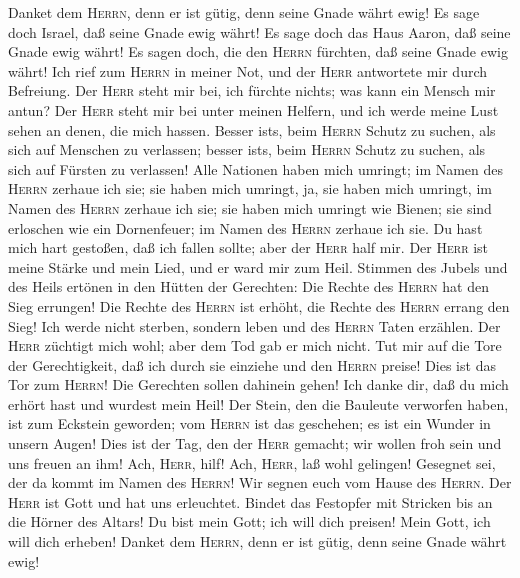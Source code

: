  Danket dem \textsc{Herrn}, denn er ist gütig, denn seine
Gnade währt ewig!  Es sage doch Israel, daß seine Gnade
ewig währt!  Es sage doch das Haus Aaron, daß seine Gnade
ewig währt!  Es sagen doch, die den \textsc{Herrn}
fürchten, daß seine Gnade ewig währt!  Ich rief zum
\textsc{Herrn} in meiner Not, und der \textsc{Herr} antwortete mir durch
Befreiung.  Der \textsc{Herr} steht mir bei, ich fürchte
nichts; was kann ein Mensch mir antun?  Der \textsc{Herr}
steht mir bei unter meinen Helfern, und ich werde meine Lust sehen an
denen, die mich hassen.  Besser ist\textquotesingle s,
beim \textsc{Herrn} Schutz zu suchen, als sich auf Menschen zu
verlassen;  besser ist\textquotesingle s, beim
\textsc{Herrn} Schutz zu suchen, als sich auf Fürsten zu verlassen!
 Alle Nationen haben mich umringt; im Namen des
\textsc{Herrn} zerhaue ich sie;  sie haben mich umringt,
ja, sie haben mich umringt, im Namen des \textsc{Herrn} zerhaue ich sie;
 sie haben mich umringt wie Bienen; sie sind erloschen
wie ein Dornenfeuer; im Namen des \textsc{Herrn} zerhaue ich sie.
 Du hast mich hart gestoßen, daß ich fallen sollte; aber
der \textsc{Herr} half mir.  Der \textsc{Herr} ist meine
Stärke und mein Lied, und er ward mir zum Heil.  Stimmen
des Jubels und des Heils ertönen in den Hütten der Gerechten: Die Rechte
des \textsc{Herrn} hat den Sieg errungen!  Die Rechte des
\textsc{Herrn} ist erhöht, die Rechte des \textsc{Herrn} errang den
Sieg!  Ich werde nicht sterben, sondern leben und des
\textsc{Herrn} Taten erzählen.  Der \textsc{Herr}
züchtigt mich wohl; aber dem Tod gab er mich nicht.  Tut
mir auf die Tore der Gerechtigkeit, daß ich durch sie einziehe und den
\textsc{Herrn} preise!  Dies ist das Tor zum
\textsc{Herrn}! Die Gerechten sollen dahinein gehen!  Ich
danke dir, daß du mich erhört hast und wurdest mein Heil!
 Der Stein, den die Bauleute verworfen haben, ist zum
Eckstein geworden;  vom \textsc{Herrn} ist das geschehen;
es ist ein Wunder in unsern Augen!  Dies ist der Tag, den
der \textsc{Herr} gemacht; wir wollen froh sein und uns freuen an ihm!
 Ach, \textsc{Herr}, hilf! Ach, \textsc{Herr}, laß wohl
gelingen!  Gesegnet sei, der da kommt im Namen des
\textsc{Herrn}! Wir segnen euch vom Hause des \textsc{Herrn}.
 Der \textsc{Herr} ist Gott und hat uns erleuchtet.
Bindet das Festopfer mit Stricken bis an die Hörner des Altars!
 Du bist mein Gott; ich will dich preisen! Mein Gott, ich
will dich erheben!  Danket dem \textsc{Herrn}, denn er
ist gütig, denn seine Gnade währt ewig!

